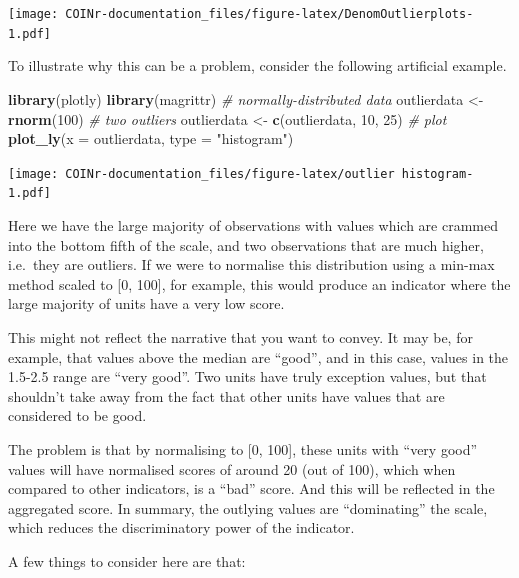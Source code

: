 \documentclass[
]{book}
\newenvironment{Shaded}{\begin{snugshade}}{\end{snugshade}}
\newcommand{\CommentTok}[1]{\textcolor[rgb]{0.56,0.35,0.01}{\textit{#1}}}
\newcommand{\DataTypeTok}[1]{\textcolor[rgb]{0.13,0.29,0.53}{#1}}
\newcommand{\DecValTok}[1]{\textcolor[rgb]{0.00,0.00,0.81}{#1}}
\newcommand{\KeywordTok}[1]{\textcolor[rgb]{0.13,0.29,0.53}{\textbf{#1}}}
\newcommand{\NormalTok}[1]{#1}
\newcommand{\StringTok}[1]{\textcolor[rgb]{0.31,0.60,0.02}{#1}}
\begin{document}
\texttt{[image: COINr-documentation\_files/figure-latex/DenomOutlierplots-1.pdf]}

To illustrate why this can be a problem, consider the following artificial example.

\begin{Shaded}
\begin{Highlighting}[]
\KeywordTok{library}\NormalTok{(plotly)}
\KeywordTok{library}\NormalTok{(magrittr)}
\CommentTok{# normally-distributed data}
\NormalTok{outlierdata <-}\StringTok{ }\KeywordTok{rnorm}\NormalTok{(}\DecValTok{100}\NormalTok{)}
\CommentTok{# two outliers}
\NormalTok{outlierdata <-}\StringTok{ }\KeywordTok{c}\NormalTok{(outlierdata, }\DecValTok{10}\NormalTok{, }\DecValTok{25}\NormalTok{)}
\CommentTok{# plot}
\KeywordTok{plot_ly}\NormalTok{(}\DataTypeTok{x =}\NormalTok{ outlierdata, }\DataTypeTok{type =} \StringTok{"histogram"}\NormalTok{)}
\end{Highlighting}
\end{Shaded}

\texttt{[image: COINr-documentation\_files/figure-latex/outlier histogram-1.pdf]}

Here we have the large majority of observations with values which are crammed into the bottom fifth of the scale, and two observations that are much higher, i.e.~they are outliers. If we were to normalise this distribution using a min-max method scaled to {[}0, 100{]}, for example, this would produce an indicator where the large majority of units have a very low score.

This might not reflect the narrative that you want to convey. It may be, for example, that values above the median are ``good'', and in this case, values in the 1.5-2.5 range are ``very good''. Two units have truly exception values, but that shouldn't take away from the fact that other units have values that are considered to be good.

The problem is that by normalising to {[}0, 100{]}, these units with ``very good'' values will have normalised scores of around 20 (out of 100), which when compared to other indicators, is a ``bad'' score. And this will be reflected in the aggregated score. In summary, the outlying values are ``dominating'' the scale, which reduces the discriminatory power of the indicator.

A few things to consider here are that:
\end{document}
